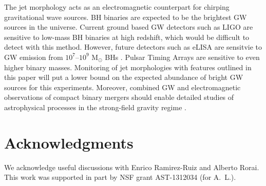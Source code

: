 \documentclass[iop]{emulateapj}
\begin{document}
The jet morphology acts as an electromagnetic counterpart for chirping
gravitational wave sources.  BH binaries are expected to be the
brightest GW sources in the universe.  Current ground based GW
detectors such as LIGO are sensitive to low-mass BH binaries at high
redshift, which would be difficult to detect with this method.
However, future detectors such as eLISA are sensitvie to GW emission
from $10^7$--$10^9$ M$_\odot$ BHs \citep{2013CQGra..30x4009S}.  Pulsar
Timing Arrays are sensitive to even higher binary masses.  Monitoring
of jet morphologies with features outlined in this paper will put a
lower bound on the expected abundance of bright GW sources for this
experiments. Moreover, combined GW and electromagnetic observations of
compact binary mergers should enable detailed studies of astrophysical
processes in the strong-field gravity regime
\citep{2005ApJ...629...15H}.


\section*{Acknowledgments}

We acknowledge useful discussions with Enrico Ramirez-Ruiz and Alberto
Rorai.  This work was supported in part by NSF grant AST-1312034 (for
A.~L.).


\end{document}
